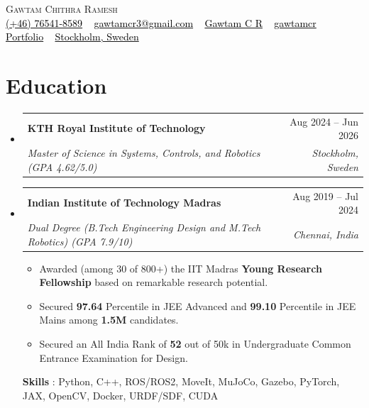 \documentclass[letterpaper, 11pt]{article}
\makeatletter
\newcommand{\vTableRowSep}{-2pt}   %
\newcommand{\vItemTop}{-2pt}       %
\newcommand{\vSubheadingEnd}{-12pt}%
\newcommand{\vListStart}{-0.3em}   %
\newcommand{\vListGroupEnd}{-1.5em}%
\newcommand{\vHeadingName}{3pt}    %
\newcommand{\vHeadingEnd}{-8pt}    %
\newcommand{\vEduSep}{0pt}         %
\newcommand{\vEduItemSep}{-0.3em}  %
\newcommand{\vEduSkills}{-0.7em}   %
\newcommand{\resumeSubheading}[4]{
\vspace{\vItemTop}
\item
\begin{tabular*}{1.0\textwidth}[t]{l@{\extracolsep{\fill}}r}
	\textbf{#1}       & {\small #2} \\
     [\vTableRowSep]
	\textit{{\small#3}} & \textit{\small #4} \\
\end{tabular*}
\vspace{\vSubheadingEnd}
}
\newcommand{\resumeSubHeadingListStart}{\begin{itemize}[leftmargin=0.0in, label={}]}
\newcommand{\resumeSubHeadingListEnd}{\end{itemize}\vspace{\vListGroupEnd}}
\makeatother
\begin{document}
\begin{center}
    {\Huge \scshape Gawtam Chithra Ramesh} \\
    \vspace{\vHeadingName}
    \small
    { \href{tel:+46764518589}{{\faMobile*} \textcolor{black}{(+46) 76541-8589}} ~
    \href{mailto:gawtamcr3@gmail.com}{{\faPaperPlane} \textcolor{black}{gawtamcr3@gmail.com}} ~
    \href{https://linkedin.com/in/gawtamcr/}{{\faLinkedinIn} \textcolor{black}{Gawtam C R}} ~
    \href{https://github.com/gawtamcr}{{\faGithub} \textcolor{black}{gawtamcr}} ~
    \href{https://gawtamcr.github.io/}{{\faGlobe} \textcolor{black}{Portfolio}} ~
    \href{https://maps.google.com/?q=Stockholm,Sweden}{{\faMapMarker*} \textcolor{black}{Stockholm, Sweden}}
    }
    \vspace{\vHeadingEnd}
\end{center}

\section{\color{Blue}Education}
    \resumeSubHeadingListStart
    \resumeSubheading{KTH Royal Institute of Technology}{Aug 2024 -- Jun 2026}{Master of Science in Systems, Controls, and Robotics \textnormal{(GPA 4.62/5.0)}}{Stockholm, Sweden}
    \vspace{\vEduSep}
    \resumeSubheading{Indian Institute of Technology Madras}{Aug 2019 -- Jul 2024}{Dual Degree (B.Tech Engineering Design and M.Tech Robotics) \textnormal{(GPA 7.9/10)}}{Chennai, India}
    \vspace{\vListStart}
    \small{
    \begin{itemize}[leftmargin=0.15in]
        \setlength{\itemsep}{\vEduItemSep}
        \item Awarded (among 30 of 800+) the IIT Madras \textbf{Young Research Fellowship} based on remarkable research potential.
        \item Secured \textbf{97.64} Percentile in JEE Advanced and \textbf{99.10} Percentile in JEE Mains among \textbf{1.5M} candidates.
        \item Secured an All India Rank of \textbf{52} out of 50k in Undergraduate Common Entrance Examination for Design.
    \end{itemize}
    }
    \vspace{\vEduSkills}
    \textbf{Skills} : Python, C++, ROS/ROS2, MoveIt, MuJoCo, Gazebo, PyTorch, JAX, OpenCV, Docker, URDF/SDF, CUDA
    \resumeSubHeadingListEnd
\end{document}
